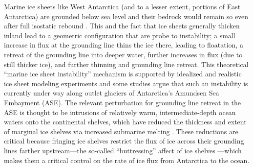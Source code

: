 \documentclass[tc, manuscript]{copernicus}
\begin{document}
Marine ice sheets like West Antarctica (and to a lesser extent, portions of East Antarctica) are grounded below sea level and their bedrock would remain so even after full isostatic rebound \citep{barletta2018}. This and the fact that ice sheets generally thicken inland lead to a geometric configuration that are probe to instability; a small increase in flux at the grounding line thins the ice there, leading to floatation, a retreat of the grounding line into deeper water, further increases in flux (due to still thicker ice), and further thinning and grounding line retreat. This theoretical ``marine ice sheet instability'' mechanism \citep{mercer1978, schoof2007} is supported by idealized \citep[e.g.,][]{schoof2012, asay2016} and realistic \citep[e.g.,][]{Cornford2015,royston2016} ice sheet modeling experiments and some studies \citep{joughin2014,rignot2014} argue that such an instability is currently under way along outlet glaciers of Antarctica's Amundsen Sea Embayment (ASE). The relevant perturbation for grounding line retreat in the ASE is thought to be intrusions of relatively warm, intermediate-depth ocean waters onto the continental shelves, which have reduced the thickness and extent of marginal ice shelves via increased submarine melting \citep[e.g.,][]{JenkinsEtAl2016}. These reductions are critical because fringing ice shelves restrict the flux of ice across their grounding lines farther upstream---the so-called ``buttressing'' affect of ice shelves \citep{gudmundsson2012, gudmundsson2013, derydt2015}---which makes them a critical control on the rate of ice flux from Antarctica to the ocean.

\end{document}
